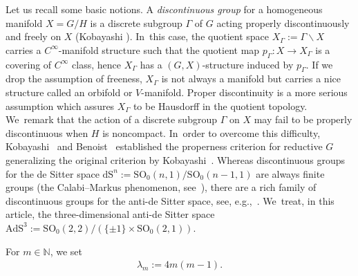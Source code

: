 Let us recall some basic notions.
A \textit{discontinuous group} for a homogeneous manifold \mbox{$X\!=\!G/H$}
is a discrete subgroup $\Gamma$ of $G$ acting properly discontinuously
and freely on $X$ (Kobayashi \cite[Definition~1.3]{Ko01}). In~this case, the quotient space $X_{\Gamma}:=\Gamma\backslash X$ carries a
$C^{\infty}$-manifold structure such that
the quotient map $p_{\Gamma}\colon X\rightarrow X_{\Gamma}$ is a covering of
$C^{\infty}$ class, hence $X_{\Gamma}$ has a $(G,X)$-structure induced by $p_{\Gamma}$.
If we drop the assumption of freeness, $X_{\Gamma}$ is not always a manifold but
carries a nice structure called an orbifold or $V$-manifold.
Proper discontinuity is a more
serious assumption which assures $X_{\Gamma}$ to be Hausdorff in the quotient topology. We~remark that the action of a discrete subgroup $\Gamma$ on $X$
may fail to be properly discontinuous
when $H$ is noncompact. In~order to overcome this difficulty,
Kobayashi~\cite{Kob96} and Benoist~\cite{Ben96} established the properness criterion
for reductive $G$ generalizing the original criterion by Kobayashi~\cite{Kob89}.
Whereas discontinuous groups for the de Sitter space
$\mathrm{dS}^{n}:=\mathrm{SO}_{0}(n,1)/\mathrm{SO}_{0}(n-1,1)$
are always finite groups
(the Calabi--Markus phenomenon, see~\cite{CaMa62, Kob89}),
there are a rich family of discontinuous groups for
the anti-de Sitter space, see, e.g.,~\cite{Go85, Kob98, Sa00}. We~treat, in this article, the three-dimensional anti-de Sitter space
$\mathrm{AdS}^{3}:=\mathrm{SO}_{0}(2,2)/(\{\pm1\}\times\mathrm{SO}_{0}(2,1))$.

For $m\in \mathbb{N}$, we set
\begin{gather*}%
\lambda_{m} := 4m(m-1).
\end{gather*}
